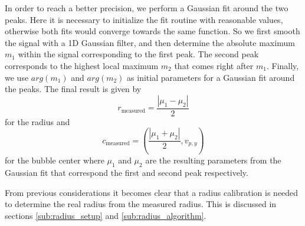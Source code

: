	In order to reach a better precision, we perform a Gaussian fit around the two peaks. Here it is necessary to initialize the fit routine with reasonable values, otherwise both fits would converge towards the same function. So we first smooth the signal with a 1D Gaussian filter, and then determine the absolute maximum $m_1$ within the signal corresponding to the first peak. The second peak corresponds to the highest local maximum $m_2$ that comes right after $m_1$. Finally, we use $arg(m_1)$ and $arg(m_2)$ as initial parameters for a Gaussian fit around the peaks. The final result is given by
	\begin{equation}
		r_{\text{measured}} = \dfrac{| \mu_1 - \mu_2 |}{2}
		\label{eq:get_radius}
	\end{equation}
	for the radius and 
	\begin{equation}
		c_{\text{measured}} =
						 \left( 
							\dfrac{| \mu_1 + \mu_2 |}{2} ,
							 v_{p,y}
						 \right)
	\end{equation}
	for the bubble center 
	where $\mu_1$ and $\mu_2$ are the resulting parameters from the Gaussian fit that correspond the first and second peak respectively. 
	
	From previous considerations it becomes clear that a radius calibration is needed to determine the real radius from the measured radius. This is discussed in sections \ref{sub:radius_setup} and \ref{sub:radius_algorithm}.

